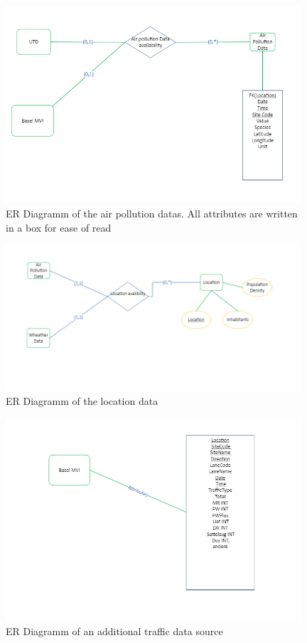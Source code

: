 \documentclass{article}
\begin{document}
\begin{figure}[H]
\centering
\includegraphics[width=11cm]{third.png}
\caption{ER Diagramm of the air pollution datas. All attributes are written in a box for ease of read}
\end{figure}

\begin{figure}[H]
\centering
\includegraphics[width=11cm]{fourth.png}
\caption{ER Diagramm of the location data}
\end{figure}

\begin{figure}[H]
\centering
\includegraphics[width=11cm]{fifth.png}
\caption{ER Diagramm of an additional traffic data source}
\end{figure}
\end{document}
